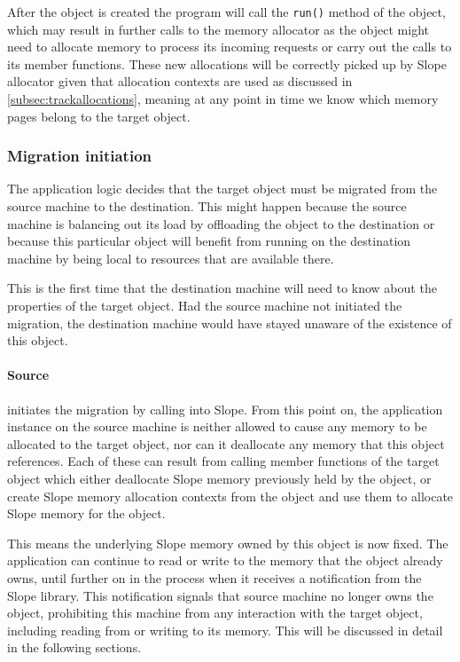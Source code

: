 After the object is created the program will call the \texttt{run()} method
of the object, which may result in further calls to the memory allocator as
the object might need to allocate memory to process its incoming requests or
carry out the calls to its member functions. These new allocations will be
correctly picked up by Slope allocator given that allocation contexts are used
as discussed in \autoref{subsec:trackallocations}, meaning at any point in time we
know which memory pages belong to the target object.

\subsubsection{Migration initiation}
The application logic decides that the target object must be migrated from the
source machine to the destination. This might happen because the source machine
is balancing out its load by offloading the object to the destination or because
this particular object will benefit from running on the destination machine
by being local to resources that are available there.

This is the first time that the destination
machine will need to know about the properties of the target object. Had the
source machine not initiated the migration, the destination machine would have
stayed unaware of the existence of this object.

\paragraph{Source}
initiates the migration by calling into Slope. From this point
on, the application instance on the source machine is neither allowed to
cause any memory to be allocated to the target object, nor can it deallocate any memory that
this object references. Each of these can result from calling member functions
of the target object which either deallocate Slope memory previously held by the
object, or create Slope memory allocation contexts from the object and
use them to allocate Slope memory for the object.

This means the underlying Slope memory owned by this object is now
fixed. The application can continue to read or write to the memory that the
object already owns, until further on in the process when it receives a
notification from the Slope library. This notification signals that source
machine no longer owns the object, prohibiting this machine from any
interaction with the target object, including reading from or writing to its
memory. This will be discussed in detail in the following sections.

